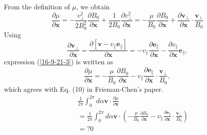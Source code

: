 \documentclass{llncs}
\begin{document}
From the definition of $\mu$, we obtain
\begin{equation}
  \label{16-9-21-3} \frac{\partial \mu}{\partial \mathbf{x}} = -
  \frac{v_{\perp}^2}{2 B^2_0} \frac{\partial B_0}{\partial \mathbf{x}} +
  \frac{1}{2 B_0}  \frac{\partial v_{\perp}^2}{\partial \mathbf{x}} = -
  \frac{\mu}{B_0}  \frac{\partial B_0}{\partial \mathbf{x}} + \frac{\partial
  \mathbf{v}_{\perp}}{\partial \mathbf{x}} \cdot
  \frac{\mathbf{v}_{\perp}}{B_0}
\end{equation}
Using
\begin{equation}
  \frac{\partial \mathbf{v}_{\perp}}{\partial \mathbf{x}} = \frac{\partial
  [\mathbf{v}- v_{\parallel} \mathbf{e}_{\parallel}]}{\partial \mathbf{x}} = -
  v_{\parallel} \frac{\partial \mathbf{e}_{\parallel}}{\partial \mathbf{x}} -
  \frac{\partial v_{\parallel}}{\partial \mathbf{x}} \mathbf{e}_{\parallel},
\end{equation}
expression (\ref{16-9-21-3}) is written as
\begin{equation}
  \frac{\partial \mu}{\partial \mathbf{x}} = - \frac{\mu}{B_0}  \frac{\partial
  B_0}{\partial \mathbf{x}} - v_{\parallel} \frac{\partial
  \mathbf{e}_{\parallel}}{\partial \mathbf{x}} \cdot
  \frac{\mathbf{v}_{\perp}}{B_0},
\end{equation}
which agrees with Eq. (10) in Frieman-Chen's paper{\cite{frieman1982}}.
\begin{eqnarray*}
  &  & \frac{1}{2 \pi} \int_0^{2 \pi} d \alpha \mathbf{v} \cdot
  \frac{\partial \mu}{\partial \mathbf{x}}\\
  &  & = \frac{1}{2 \pi} \int_0^{2 \pi} d \alpha \mathbf{v} \cdot \left( -
  \frac{\mu}{B_0}  \frac{\partial B_0}{\partial \mathbf{x}} - v_{\parallel}
  \frac{\partial \mathbf{e}_{\parallel}}{\partial \mathbf{x}} \cdot
  \frac{\mathbf{v}_{\perp}}{B_0} \right)\\
  &  & = ? 0
\end{eqnarray*}
\end{document}

